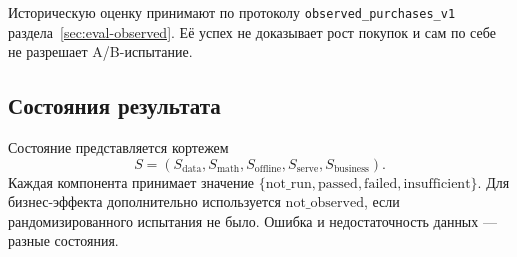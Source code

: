 \documentclass[12pt,a4paper]{article}
\newcommand{\code}[1]{{\ttfamily\small\nolinkurl{#1}}}
\theoremstyle{plainru}
\begin{document}
Историческую оценку принимают по протоколу \code{observed_purchases_v1}
раздела~\ref{sec:eval-observed}. Её успех не доказывает рост покупок
и сам по себе не разрешает A/B-испытание.

\subsection{Состояния результата}

Состояние представляется кортежем
\begin{equation}\label{eq:acceptance-state}
S=(S_{\mathrm{data}},S_{\mathrm{math}},S_{\mathrm{offline}},
S_{\mathrm{serve}},S_{\mathrm{business}}).
\end{equation}
Каждая компонента принимает значение
\(\{\mathrm{not\_run},\mathrm{passed},\mathrm{failed},
\mathrm{insufficient}\}\). Для бизнес-эффекта дополнительно
используется \(\mathrm{not\_observed}\), если рандомизированного
испытания не было. Ошибка и недостаточность данных --- разные состояния.
\end{document}
